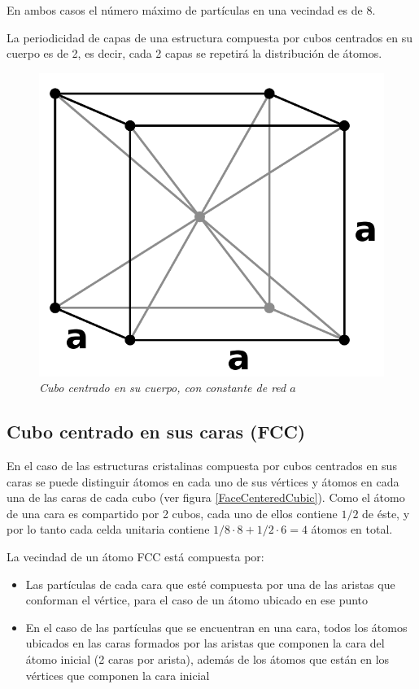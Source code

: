 En ambos casos el número máximo de partículas en una vecindad es de 8.

La periodicidad de capas de una estructura compuesta por cubos centrados en su cuerpo es de 2, es decir, cada 2 capas se repetirá la distribución de átomos.

\begin{figure}[ht]
  \centering
  \includegraphics[scale=.6]{images/BodyCenteredCubic}
  \caption{\em Cubo centrado en su cuerpo, con constante de red $a$}
  \label{BodyCenteredCubic}
\end{figure}


\subsection{Cubo centrado en sus caras (FCC)}
\label{structureFCC}
En el caso de las estructuras cristalinas compuesta por cubos centrados en sus caras se puede distinguir átomos en cada uno de sus vértices y átomos en cada una de las caras de cada cubo (ver figura \ref{FaceCenteredCubic}). Como el átomo de una cara es compartido por 2 cubos, cada uno de ellos contiene $1/2$ de éste, y por lo tanto cada celda unitaria contiene $1/8 \cdot 8 + 1/2 \cdot 6 = 4$ átomos en total.

La vecindad de un átomo FCC está compuesta por:

\begin{itemize}
  \item Las partículas de cada cara que esté compuesta por una de las aristas que conforman el vértice, para el caso de un átomo ubicado en ese punto
  \item En el caso de las partículas que se encuentran en una cara, todos los átomos ubicados en las caras formados por las aristas que componen la cara del átomo inicial (2 caras por arista), además de los átomos que están en los vértices que componen la cara inicial
\end{itemize}

